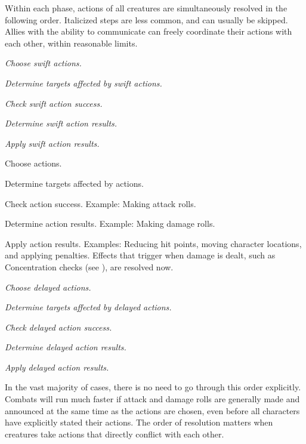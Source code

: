         Within each phase, actions of all creatures are simultaneously resolved in the following order.
        Italicized steps are less common, and can usually be skipped.
        Allies with the ability to communicate can freely coordinate their actions with each other, within reasonable limits.

        \begin{enumerate*}
            \item \textit{Choose swift actions.}
            \item \textit{Determine targets affected by swift actions.}
            \item \textit{Check swift action success.}
            \item \textit{Determine swift action results.}
            \item \textit{Apply swift action results.}
            \item Choose actions.
            \item Determine targets affected by actions.
            \item Check action success.
                Example: Making attack rolls.
            \item Determine action results.
                Example: Making damage rolls.
            \item Apply action results.
                Examples: Reducing hit points, moving character locations, and applying penalties.
                Effects that trigger when damage is dealt, such as Concentration checks (see ), are resolved now.
            \item \textit{Choose delayed actions.}
            \item \textit{Determine targets affected by delayed actions.}
            \item \textit{Check delayed action success.}
            \item \textit{Determine delayed action results.}
            \item \textit{Apply delayed action results.}
        \end{enumerate*}

        In the vast majority of cases, there is no need to go through this order explicitly.
        Combats will run much faster if attack and damage rolls are generally made and announced at the same time as the actions are chosen, even before all characters have explicitly stated their actions.
        The order of resolution matters when creatures take actions that directly conflict with each other.

